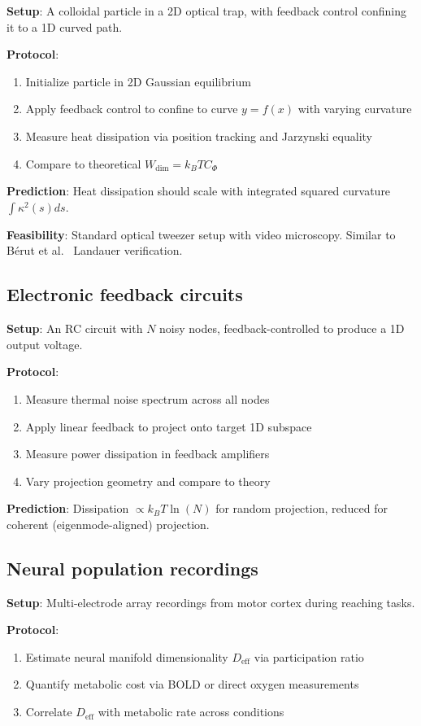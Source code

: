 \documentclass[aps,prx,twocolumn,superscriptaddress,floatfix]{revtex4-2}
\begin{document}
\textbf{Setup}: A colloidal particle in a 2D optical trap, with feedback control confining it to a 1D curved path.

\textbf{Protocol}:
\begin{enumerate}
\item Initialize particle in 2D Gaussian equilibrium
\item Apply feedback control to confine to curve $y = f(x)$ with varying curvature
\item Measure heat dissipation via position tracking and Jarzynski equality
\item Compare to theoretical $W_\mathrm{dim} = k_B T C_\Phi$
\end{enumerate}

\textbf{Prediction}: Heat dissipation should scale with integrated squared curvature $\int \kappa^2(s) ds$.

\textbf{Feasibility}: Standard optical tweezer setup with video microscopy. Similar to Bérut et al.~\cite{berut2012} Landauer verification.

\subsection{Electronic feedback circuits}

\textbf{Setup}: An RC circuit with $N$ noisy nodes, feedback-controlled to produce a 1D output voltage.

\textbf{Protocol}:
\begin{enumerate}
\item Measure thermal noise spectrum across all nodes
\item Apply linear feedback to project onto target 1D subspace
\item Measure power dissipation in feedback amplifiers
\item Vary projection geometry and compare to theory
\end{enumerate}

\textbf{Prediction}: Dissipation $\propto k_B T \ln(N)$ for random projection, reduced for coherent (eigenmode-aligned) projection.

\subsection{Neural population recordings}

\textbf{Setup}: Multi-electrode array recordings from motor cortex during reaching tasks.

\textbf{Protocol}:
\begin{enumerate}
\item Estimate neural manifold dimensionality $D_\mathrm{eff}$ via participation ratio
\item Quantify metabolic cost via BOLD or direct oxygen measurements
\item Correlate $D_\mathrm{eff}$ with metabolic rate across conditions
\end{enumerate}
\end{document}
